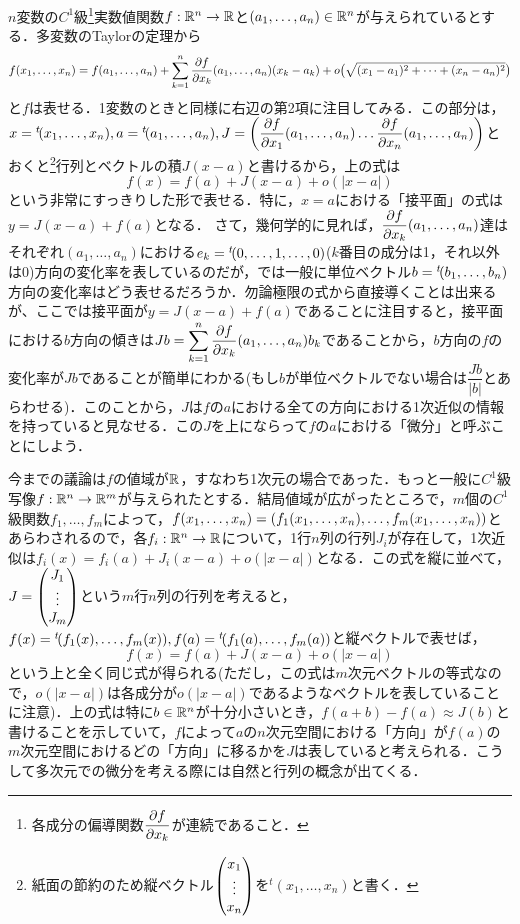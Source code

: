 $n$変数の$C^1$級\footnote{各成分の偏導関数$\displaystyle\frac{\partial f}{\partial x_k}$が連続であること．}実数値関数$f:{\mathbb R}^n\rightarrow{\mathbb R}$と$(a_1,\dots,a_n)\in{\mathbb R}^n$が与えられているとする．多変数のTaylorの定理から
$$
f(x_1,\dots,x_n)=f(a_1,\dots,a_n)+\sum_{k=1}^{n}\displaystyle\frac{\partial f}{\partial x_k}(a_1,\dots,a_n)(x_k-a_k)+o\bigl(\sqrt{(x_1-a_1)^2+\cdots+(x_n-a_n)^2}\bigr)
$$
と$f$は表せる．1変数のときと同様に右辺の第2項に注目してみる．この部分は，$x={}^t\!(x_1,\dots,x_n), a={}^t\!(a_1,\dots,a_n), J=\left(\displaystyle\frac{\partial f}{\partial x_1}(a_1,\dots,a_n) \dots \displaystyle\frac{\partial f}{\partial x_n}(a_1,\dots,a_n)\right)$とおくと\footnote{紙面の節約のため縦ベクトル$\begin{pmatrix} x_1 \\ \vdots \\ x_n\end{pmatrix}$を${}^t\!(x_1,\dots,x_n)$と書く．}行列とベクトルの積$J(x-a)$と書けるから，上の式は
$$
f(x)=f(a)+J(x-a)+o(|x-a|)
$$
という非常にすっきりした形で表せる．特に，$x=a$における「接平面」の式は$y=J(x-a)+f(a)$となる．
さて，幾何学的に見れば，$\displaystyle\frac{\partial f}{\partial x_k}(a_1,\dots,a_n)$達はそれぞれ$(a_1,\dots,a_n)$における$e_k={}^t\!(0,\dots,1,\dots,0)$($k$番目の成分は1，それ以外は0)方向の変化率を表しているのだが，では一般に単位ベクトル$b={}^t\!(b_1,\dots,b_n)$方向の変化率はどう表せるだろうか．勿論極限の式から直接導くことは出来るが、ここでは接平面が$y=J(x-a)+f(a)$であることに注目すると，接平面における$b$方向の傾きは$Jb=\displaystyle\sum_{k=1}^{n}\displaystyle\frac{\partial f}{\partial x_k}(a_1,\dots,a_n)b_k$であることから，$b$方向の$f$の変化率が$Jb$であることが簡単にわかる(もし$b$が単位ベクトルでない場合は$\dfrac{Jb}{|b|}$とあらわせる)．このことから，$J$は$f$の$a$における全ての方向における1次近似の情報を持っていると見なせる．この$J$を上にならって$f$の$a$における「微分」と呼ぶことにしよう．


今までの議論は$f$の値域が${\mathbb R}$，すなわち1次元の場合であった．もっと一般に$C^1$級写像$f:{\mathbb R}^n\rightarrow{\mathbb R}^m$が与えられたとする．結局値域が広がったところで，$m$個の$C^1$級関数$f_1,\dots,f_m$によって，$f(x_1,\dots,x_n)=(f_1(x_1,\dots,x_n),\dots,f_m(x_1,\dots,x_n))$とあらわされるので，各$f_i:{\mathbb R}^n\rightarrow{\mathbb R}$について，1行$n$列の行列$J_i$が存在して，1次近似は$f_i(x)=f_i(a)+J_i(x-a)+o(|x-a|)$となる．この式を縦に並べて，$J=\begin{pmatrix} J_1\\ \vdots \\J_m\end{pmatrix}$という$m$行$n$列の行列を考えると，$f(x)={}^t\!(f_1(x),\dots,f_m(x)),f(a)={}^t\!(f_1(a),\dots,f_m(a))$と縦ベクトルで表せば，
$$
f(x)=f(a)+J(x-a)+o(|x-a|)
$$
という上と全く同じ式が得られる(ただし，この式は$m$次元ベクトルの等式なので，$o(|x-a|)$は各成分が$o(|x-a|)$であるようなベクトルを表していることに注意)．上の式は特に$b\in{\mathbb R}^n$が十分小さいとき，$f(a+b)-f(a)\approx J(b)$と書けることを示していて，$f$によって$a$の$n$次元空間における「方向」が$f(a)$の$m$次元空間におけるどの「方向」に移るかを$J$は表していると考えられる．こうして多次元での微分を考える際には自然と行列の概念が出てくる．


